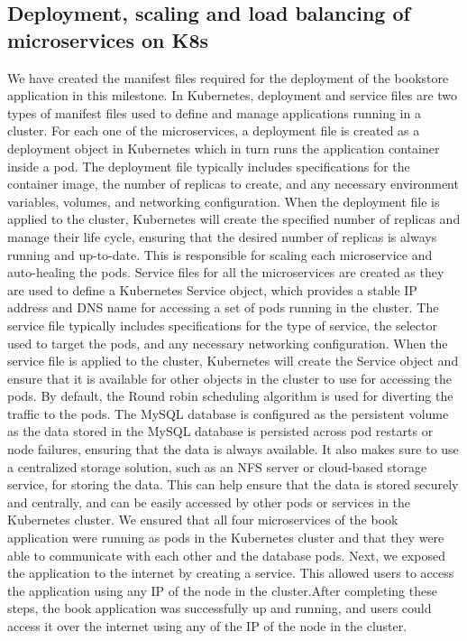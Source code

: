 \subsection{Deployment, scaling and load balancing of microservices on K8s}
We have created the manifest files required for the deployment of the bookstore application in this milestone. In Kubernetes, deployment and service files are two types of manifest files used to define and manage applications running in a cluster. For each one of the microservices, a deployment file is created as a deployment object in Kubernetes which in turn runs the application container inside a pod. The deployment file typically includes specifications for the container image, the number of replicas to create, and any necessary environment variables, volumes, and networking configuration. When the deployment file is applied to the cluster, Kubernetes will create the specified number of replicas and manage their life cycle, ensuring that the desired number of replicas is always running and up-to-date. This is responsible for scaling each microservice and auto-healing the pods. Service files for all the microservices are created as they are used to define a Kubernetes Service object, which provides a stable IP address and DNS name for accessing a set of pods running in the cluster. The service file typically includes specifications for the type of service, the selector used to target the pods, and any necessary networking configuration. When the service file is applied to the cluster, Kubernetes will create the Service object and ensure that it is available for other objects in the cluster to use for accessing the pods. By default, the Round robin scheduling algorithm is used for diverting the traffic to the pods. The MySQL database is configured as the persistent volume as the data stored in the MySQL database is persisted across pod restarts or node failures, ensuring that the data is always available. It also makes sure to use a centralized storage solution, such as an NFS server or cloud-based storage service, for storing the data. This can help ensure that the data is stored securely and centrally, and can be easily accessed by other pods or services in the Kubernetes cluster. We ensured that all four microservices of the book application were running as pods in the Kubernetes cluster and that they were able to communicate with each other and the database pods. Next, we exposed the application to the internet by creating a service. This allowed users to access the application using any IP of the node in the cluster.After completing these steps, the book application was successfully up and running, and users could access it over the internet using any of the IP of the node in the cluster.

